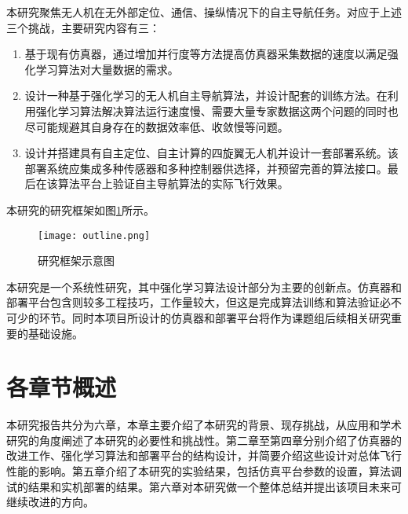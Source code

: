 本研究聚焦无人机在无外部定位、通信、操纵情况下的自主导航任务。对应于上述三个挑战，主要研究内容有三：
\begin{enumerate}
  \item 基于现有仿真器，通过增加并行度等方法提高仿真器采集数据的速度以满足强化学习算法对大量数据的需求。
  \item 设计一种基于强化学习的无人机自主导航算法，并设计配套的训练方法。在利用强化学习算法解决算法运行速度慢、需要大量专家数据这两个问题的同时也尽可能规避其自身存在的数据效率低、收敛慢等问题。
  \item 设计并搭建具有自主定位、自主计算的四旋翼无人机并设计一套部署系统。该部署系统应集成多种传感器和多种控制器供选择，并预留完善的算法接口。最后在该算法平台上验证自主导航算法的实际飞行效果。
\end{enumerate}
本研究的研究框架如图\ref{fig_outline}所示。
\begin{figure}
  \centering
  \texttt{[image: outline.png]}
  \caption{研究框架示意图}
  \label{fig_outline}
\end{figure}

本研究是一个系统性研究，其中强化学习算法设计部分为主要的创新点。仿真器和部署平台包含则较多工程技巧，工作量较大，但这是完成算法训练和算法验证必不可少的环节。同时本项目所设计的仿真器和部署平台将作为课题组后续相关研究重要的基础设施。

\section{各章节概述}
\label{outline}
本研究报告共分为六章，本章主要介绍了本研究的背景、现存挑战，从应用和学术研究的角度阐述了本研究的必要性和挑战性。第二章至第四章分别介绍了仿真器的改进工作、强化学习算法和部署平台的结构设计，并简要介绍这些设计对总体飞行性能的影响。第五章介绍了本研究的实验结果，包括仿真平台参数的设置，算法调试的结果和实机部署的结果。第六章对本研究做一个整体总结并提出该项目未来可继续改进的方向。






